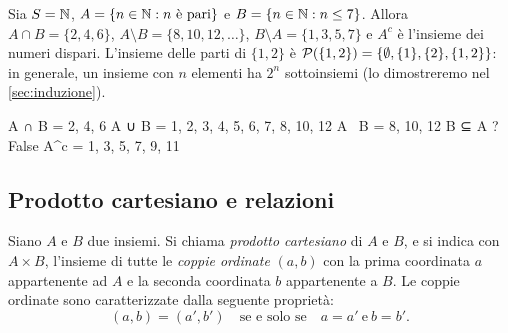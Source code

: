 \begin{esempio}
Sia $S=\mathbb{N}$, $A=\{n\in\mathbb{N} : n \text{ è pari}\}$ e $B=\{n\in\mathbb{N} : n\le 7\}$. Allora
$A\cap B=\{2,4,6\}$, $A\setminus B=\{8,10,12,\dots\}$, $B\setminus A=\{1,3,5,7\}$ e
$A^{c}$ è l'insieme dei numeri dispari. L'insieme delle parti di $\{1,2\}$ è
$\mathcal{P}(\{1,2\})=\{\emptyset,\{1\},\{2\},\{1,2\}\}$: in generale, un insieme con $n$
elementi ha $2^{n}$ sottoinsiemi (lo dimostreremo nel \cref{sec:induzione}).
\end{esempio}

\begin{risultato}
A ∩ B = {2, 4, 6}
A ∪ B = {1, 2, 3, 4, 5, 6, 7, 8, 10, 12}
A \ B = {8, 10, 12}
B ⊆ A ? False
A^c   = {1, 3, 5, 7, 9, 11}
\end{risultato}

\subsection{Prodotto cartesiano e relazioni}

\begin{definizione}
Siano $A$ e $B$ due insiemi. Si chiama \emph{prodotto cartesiano} di $A$ e $B$, e si
indica con $A\times B$, l'insieme di tutte le \emph{coppie ordinate} $(a,b)$ con la
prima coordinata $a$ appartenente ad $A$ e la seconda coordinata $b$ appartenente a $B$.
Le coppie ordinate sono caratterizzate dalla seguente proprietà:
\begin{equation}\label{eq:coppie}
  (a,b)=(a',b') \quad\text{se e solo se}\quad a=a' \ \text{e}\ b=b'.
\end{equation}
\end{definizione}

\begin{marginfigure}
\centering
{}
\caption{Il prodotto cartesiano $A\times B$ di due insiemi finiti: una «griglia» di
coppie ordinate.}
\end{marginfigure}

